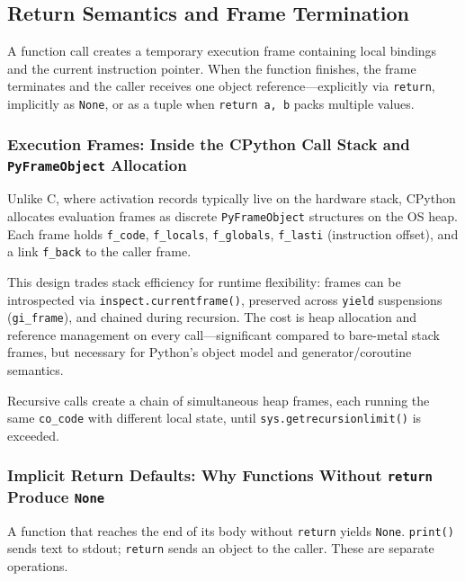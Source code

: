 \subsection{Return Semantics and Frame Termination}

A function call creates a temporary execution frame containing local bindings and the current instruction pointer. When the function finishes, the frame terminates and the caller receives one object reference---explicitly via \texttt{return}, implicitly as \texttt{None}, or as a tuple when \texttt{return a, b} packs multiple values.

\subsubsection{Execution Frames: Inside the CPython Call Stack and \texttt{PyFrameObject} Allocation}

Unlike C, where activation records typically live on the hardware stack, CPython allocates evaluation frames as discrete \texttt{PyFrameObject} structures on the OS heap. Each frame holds \texttt{f\_code}, \texttt{f\_locals}, \texttt{f\_globals}, \texttt{f\_lasti} (instruction offset), and a link \texttt{f\_back} to the caller frame.

This design trades stack efficiency for runtime flexibility: frames can be introspected via \texttt{inspect.currentframe()}, preserved across \texttt{yield} suspensions (\texttt{gi\_frame}), and chained during recursion. The cost is heap allocation and reference management on every call---significant compared to bare-metal stack frames, but necessary for Python's object model and generator/coroutine semantics.



Recursive calls create a chain of simultaneous heap frames, each running the same \texttt{co\_code} with different local state, until \texttt{sys.getrecursionlimit()} is exceeded.

\subsubsection{Implicit Return Defaults: Why Functions Without \texttt{return} Produce \texttt{None}}

A function that reaches the end of its body without \texttt{return} yields \texttt{None}. \texttt{print()} sends text to stdout; \texttt{return} sends an object to the caller. These are separate operations.

